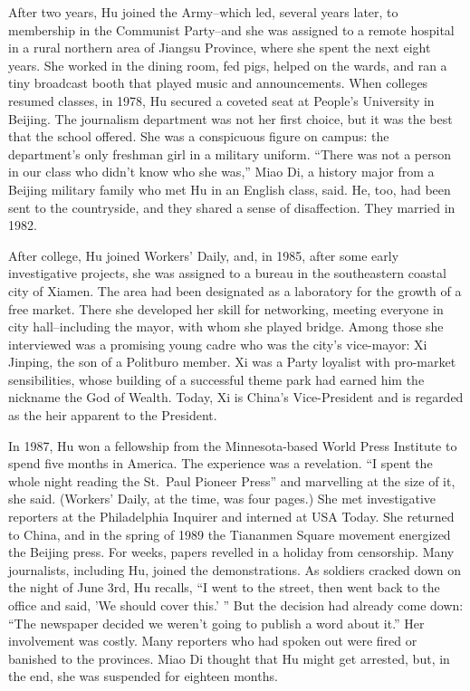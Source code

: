 ﻿\documentclass[12pt]{article}
\begin{document}
After two years, Hu joined the Army--which led, several years later, to membership in the Communist
Party--and she was assigned to a remote hospital in a rural northern area of Jiangsu Province, where
she spent the next eight years. She worked in the dining room, fed pigs, helped on the wards, and
ran a tiny broadcast booth that played music and announcements. When colleges resumed classes, in
1978, Hu secured a coveted seat at People's University in Beijing. The journalism department was not
her first choice, but it was the best that the school offered. She was a conspicuous figure on
campus: the department's only freshman girl in a military uniform. ``There was not a person in our
class who didn't know who she was,'' Miao Di, a history major from a Beijing military family who met
Hu in an English class, said. He, too, had been sent to the countryside, and they shared a sense of
disaffection. They married in 1982.

After college, Hu joined Workers' Daily, and, in 1985, after some early investigative projects, she
was assigned to a bureau in the southeastern coastal city of Xiamen. The area had been designated as
a laboratory for the growth of a free market. There she developed her skill for networking, meeting
everyone in city hall--including the mayor, with whom she played bridge. Among those she interviewed
was a promising young cadre who was the city's vice-mayor: Xi Jinping, the son of a Politburo
member. Xi was a Party loyalist with pro-market sensibilities, whose building of a successful theme
park had earned him the nickname the God of Wealth. Today, Xi is China's Vice-President and is
regarded as the heir apparent to the President.

In 1987, Hu won a fellowship from the Minnesota-based World Press Institute to spend five months in
America. The experience was a revelation. ``I spent the whole night reading the St.~Paul Pioneer
Press'' and marvelling at the size of it, she said. (Workers' Daily, at the time, was four pages.)
She met investigative reporters at the Philadelphia Inquirer and interned at USA Today. She returned
to China, and in the spring of 1989 the Tiananmen Square movement energized the Beijing press. For
weeks, papers revelled in a holiday from censorship. Many journalists, including Hu, joined the
demonstrations. As soldiers cracked down on the night of June 3rd, Hu recalls, ``I went to the
street, then went back to the office and said, 'We should cover this.' '' But the decision had
already come down: ``The newspaper decided we weren't going to publish a word about it.'' Her
involvement was costly. Many reporters who had spoken out were fired or banished to the provinces.
Miao Di thought that Hu might get arrested, but, in the end, she was suspended for eighteen months.
\end{document}
